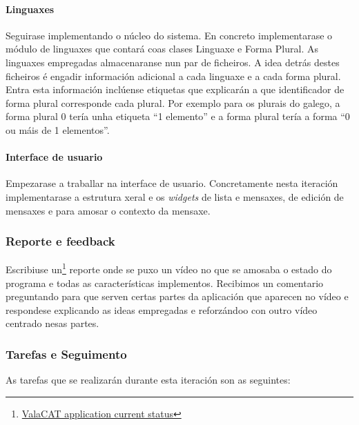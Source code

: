 \paragraph{Linguaxes}
Seguirase implementando o núcleo do sistema. En concreto implementarase o módulo de linguaxes que contará coas clases Linguaxe e Forma Plural. As linguaxes empregadas almacenaranse nun par de ficheiros. A idea detrás destes ficheiros é engadir información adicional a cada linguaxe e a cada forma plural. Entra esta información inclúense etiquetas que explicarán a que identificador de forma plural corresponde cada plural. Por exemplo para os plurais do galego, a forma plural 0 tería unha etiqueta ``1 elemento'' e a forma plural tería a forma ``0 ou máis de 1 elementos''.

\paragraph{Interface de usuario}
Empezarase a traballar na interface de usuario. Concretamente nesta iteración implementarase a estrutura xeral e os \emph{widgets} de lista e mensaxes, de edición de mensaxes e para amosar o contexto da mensaxe.

\subsubsection{Reporte e feedback}
Escribiuse un\footnote{\href{http://aquelando.info/valacat-application-current-status/}{ValaCAT application current status}} reporte onde se puxo un vídeo no que se amosaba o estado do programa e todas as características implementos. Recibimos un comentario preguntando para que serven certas partes da aplicación que aparecen no vídeo e respondese explicando as ideas empregadas e reforzándoo con outro vídeo centrado nesas partes.

\subsubsection{Tarefas e Seguimento}

As tarefas que se realizarán durante esta iteración son as seguintes:

